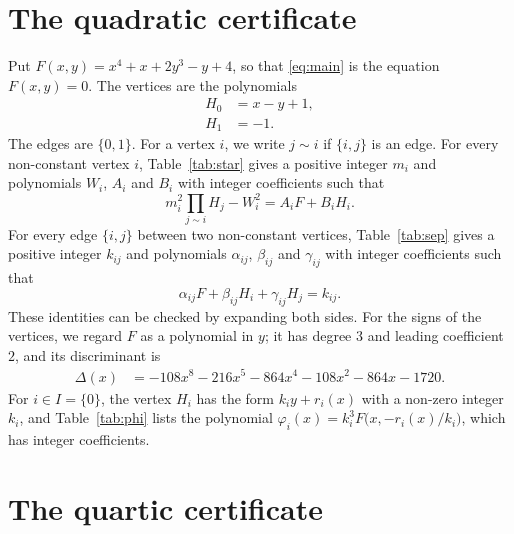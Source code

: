 \documentclass[11pt]{article}
\begin{document}
\section{The quadratic certificate}

Put $F(x,y)=x^{4}+x+2y^{3}-y+4$, so that \eqref{eq:main} is the equation $F(x,y)=0$. The vertices are the polynomials
\begin{align*}
H_{0}&=x-y+1,\\
H_{1}&=-1.
\end{align*}
The edges are $\{0,1\}$. For a vertex $i$, we write $j\sim i$ if $\{i,j\}$ is an edge.
For every non-constant vertex $i$, Table~\ref{tab:star} gives a positive integer $m_{i}$ and polynomials $W_{i}$, $A_{i}$ and $B_{i}$ with integer coefficients such that
\begin{equation}\label{eq:star}
m_i^2\prod_{j\sim i}H_j-W_i^2=A_iF+B_iH_i.
\end{equation}
For every edge $\{i,j\}$ between two non-constant vertices, Table~\ref{tab:sep} gives a positive integer $k_{ij}$ and polynomials $\alpha_{ij}$, $\beta_{ij}$ and $\gamma_{ij}$ with integer coefficients such that
\begin{equation}\label{eq:sep}
\alpha_{ij}F+\beta_{ij}H_i+\gamma_{ij}H_j=k_{ij}.
\end{equation}
These identities can be checked by expanding both sides.
For the signs of the vertices, we regard $F$ as a polynomial in $y$; it has degree $3$ and leading coefficient $2$, and its discriminant is
\begin{align*}
\Delta(x)&=-108x^{8}-216x^{5}-864x^{4}-108x^{2}-864x-1720.
\end{align*}
For $i\in I=\{0\}$, the vertex $H_i$ has the form $k_iy+r_i(x)$ with a non-zero integer $k_i$, and Table~\ref{tab:phi} lists the polynomial $\varphi_i(x)=k_i^3F\bigl(x,-r_i(x)/k_i\bigr)$, which has integer coefficients.

\section{The quartic certificate}
\end{document}
